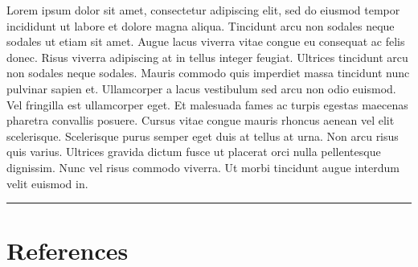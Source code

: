 \documentclass[
]{article}
\newlength{\cslhangindent}
\newlength{\cslentryspacingunit} %
\newenvironment{CSLReferences}[2] %
 {%
  \setlength{\parindent}{0pt}
  \ifodd #1
  \let\oldpar\par
  \def\par{\hangindent=\cslhangindent\oldpar}
  \fi
  \setlength{\parskip}{#2\cslentryspacingunit}
 }%
 {}
\begin{document}
Lorem ipsum dolor sit amet, consectetur adipiscing elit, sed do eiusmod tempor incididunt ut labore et dolore magna aliqua. Tincidunt arcu non sodales neque sodales ut etiam sit amet. Augue lacus viverra vitae congue eu consequat ac felis donec. Risus viverra adipiscing at in tellus integer feugiat. Ultrices tincidunt arcu non sodales neque sodales. Mauris commodo quis imperdiet massa tincidunt nunc pulvinar sapien et. Ullamcorper a lacus vestibulum sed arcu non odio euismod. Vel fringilla est ullamcorper eget. Et malesuada fames ac turpis egestas maecenas pharetra convallis posuere. Cursus vitae congue mauris rhoncus aenean vel elit scelerisque. Scelerisque purus semper eget duis at tellus at urna. Non arcu risus quis varius. Ultrices gravida dictum fusce ut placerat orci nulla pellentesque dignissim. Nunc vel risus commodo viverra. Ut morbi tincidunt augue interdum velit euismod in.

\begin{center}\rule{0.5\linewidth}{0.5pt}\end{center}

\hypertarget{references}{%
\section{References}\label{references}}

\hypertarget{refs}{}
\begin{CSLReferences}{0}{0}
\end{CSLReferences}
\end{document}
